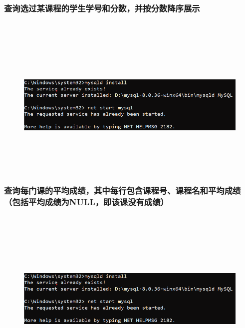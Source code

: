 \documentclass{ctexart}
\begin{document}
\subsubsection{查询选过某课程的学生学号和分数，并按分数降序展示}
\begin{lstlisting}[language=sql]
	
\end{lstlisting}
\begin{figure}[H]
	\centering 
	\includegraphics[height=7cm,width=14cm]{1.png}
	\end{figure}
\subsubsection{查询每门课的平均成绩，其中每行包含课程号、课程名和平均成绩（包括平均成绩为NULL，即该课没有成绩）}
\begin{lstlisting}[language=sql]
	
\end{lstlisting}
\begin{figure}[H]
	\centering 
	\includegraphics[height=7cm,width=14cm]{1.png}
	\end{figure}
\end{document}
